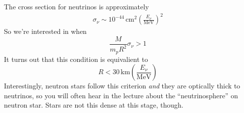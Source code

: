 \documentclass[10pt]{article}
\numberwithin{equation}{section}
\newcommand{\n}{\noindent}
\begin{document}
    \n The cross section for neutrinos is approximately
    \begin{align}
      \label{eq:338}
      \sigma_\nu\sim 10^{-44}\,\mathrm{cm^2}\left(\frac{E_\nu}{\mathrm
{MeV}}\right)^2
    \end{align}
    So we're interested in when
    \begin{equation}
      \label{eq:339}
      \frac{M}{m_pR^2}\sigma_\nu>1
    \end{equation}
    It turns out that this condition is equivalient to
    \begin{equation}
      \label{eq:341}
      R<30\,\mathrm{km}\left(\frac{E_\nu}{\mathrm{MeV}}\right)
    \end{equation}
    Interestingly, neutron stars follow this criterion \emph{and} they
    are optically thick to neutrinos, so you will often hear in the
    lecture about the ``neutrinosphere'' on neutron star. Stars are
    not this dense at this stage, though.\\
\end{document}
